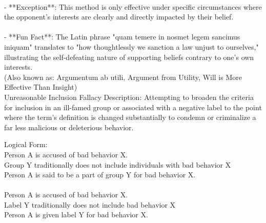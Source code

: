 \documentclass[a4paper,12pt,single,pdftex]{scrartcl}
\begin{document}
    
      
    \\

    
      - **Exception**: This method is only effective under specific circumstances where the opponent's interests are clearly and directly impacted by their belief.
    \\

    
      
    \\

    
      - **Fun Fact**: The Latin phrase "quam temere in nosmet legem sancimus iniquam" translates to "how thoughtlessly we sanction a law unjust to ourselves," illustrating the self-defeating nature of supporting beliefs contrary to one’s own interests.
    \\

  
    
      (Also known as: Argumentum ab utili, Argument from Utility, Will is More Effective Than Insight)
    \\

  

Unreasonable Inclusion Fallacy
    Description: Attempting to broaden the criteria for inclusion in an ill-famed group or associated with a negative label to the point where the term's definition is changed substantially to condemn or criminalize a far less malicious or deleterious behavior.

    
      Logical Form:
    \\

    
      Person A is accused of bad behavior X.
    \\

    
      Group Y traditionally does not include individuals with bad behavior X
    \\

    
      Person A is said to be a part of group Y for bad behavior X.
    \\

    
      
    \\

    
      Person A is accused of bad behavior X.
    \\

    
      Label Y traditionally does not include bad behavior X
    \\

    
      Person A is given label Y for bad behavior X.
    \\
\end{document}
